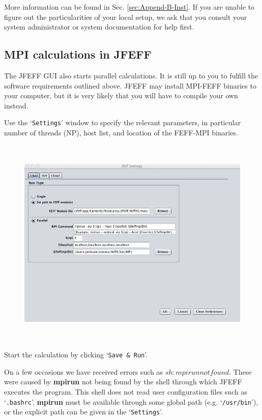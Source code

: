 \documentclass[11pt,oneside]{report} %
\newcommand{\file}[1]{`\texttt{#1}'}
\newcommand{\module}[1]{\textrm{\bf{#1}}}
\begin{document}
More information can be found in Sec. \ref{sec:Append-B-Inst}.  If you are unable to figure out the particularities of your local setup, we ask that you consult your system administrator or system documentation for help first.

\subsection{MPI calculations in JFEFF}

The JFEFF GUI also starts parallel calculations.  It is still up to you to fulfill the software requirements outlined above.  JFEFF may install MPI-FEFF binaries to your computer, but it is very likely that you will have to compile your own instead.

Use the \file{Settings} window to specify the relevant parameters, in particular number of threads (NP), host list, and location of the FEFF-MPI binaries.

\begin{figure}[H]
	\centering
		\includegraphics[height=4.0in]{settingsMPIlocal.png}
	\label{fig:settingsMPIlocal}
\end{figure}

Start the calculation by clicking \file{Save \& Run}.

On a few occasions we have received errors such as  $sh: mpirun not found $.  These were caused by \module{mpirun} not being found by the shell through which JFEFF executes the program.  This shell does not read user configuration files such as \file{.bashrc}.  \module{mpirun} must be available through some global path (e.g. \file{/usr/bin}), or the explicit path can be given in the \file{Settings}.
\end{document}
